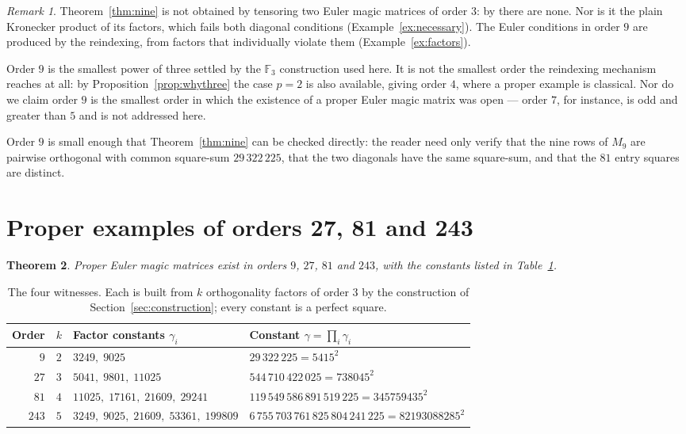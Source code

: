 \documentclass[11pt,a4paper]{amsart}
\theoremstyle{plain}
\newtheorem{theorem}{Theorem}[section]
\theoremstyle{definition}
\theoremstyle{remark}
\newtheorem{remark}[theorem]{Remark}
\newcommand{\FF}{\mathbb{F}}
\begin{document}
\begin{remark}\label{rem:nine}
Theorem~\ref{thm:nine} is not obtained by tensoring two Euler magic matrices of
order $3$: by \cite[Theorem~1.2]{Muller2026} there are none. Nor is it the plain
Kronecker product of its factors, which fails both diagonal conditions
(Example~\ref{ex:necessary}). The Euler conditions in order $9$ are produced by
the reindexing, from factors that individually violate them
(Example~\ref{ex:factors}).

Order $9$ is the smallest power of three settled by the $\FF_3$ construction used
here. It is not the smallest order the reindexing mechanism reaches at all: by
Proposition~\ref{prop:whythree} the case $p=2$ is also available, giving order
$4$, where a proper example is classical. Nor do we claim order $9$ is the
smallest order in which the existence of a proper Euler magic matrix was open ---
order $7$, for instance, is odd and greater than $5$ and is not addressed here.
\end{remark}

Order $9$ is small enough that Theorem~\ref{thm:nine} can be checked directly:
the reader need only verify that the nine rows of $M_9$ are pairwise orthogonal
with common square-sum $29\,322\,225$, that the two diagonals have the same
square-sum, and that the $81$ entry squares are distinct.

\section{Proper examples of orders 27, 81 and 243}\label{sec:tower}

\begin{theorem}\label{thm:tower}
Proper Euler magic matrices exist in orders $9$, $27$, $81$ and $243$, with the
constants listed in Table~\ref{tab:tower}.
\end{theorem}

\begin{table}[ht]
\caption{The four witnesses. Each is built from $k$ orthogonality factors of
order $3$ by the construction of Section~\ref{sec:construction}; every constant
is a perfect square.}
\label{tab:tower}
\begin{tabular}{@{}rlll@{}}
\toprule
Order & $k$ & Factor constants $\gamma_i$ & Constant $\gamma=\prod_i\gamma_i$\\
\midrule
$9$   & $2$ & $3249,\;9025$ & $29\,322\,225=5415^2$\\
$27$  & $3$ & $5041,\;9801,\;11025$ & $544\,710\,422\,025=738045^2$\\
$81$  & $4$ & $11025,\;17161,\;21609,\;29241$ &
        $119\,549\,586\,891\,519\,225=345759435^2$\\
$243$ & $5$ & $3249,\;9025,\;21609,\;53361,\;199809$ &
        $6\,755\,703\,761\,825\,804\,241\,225=82193088285^2$\\
\bottomrule
\end{tabular}
\end{table}
\end{document}
